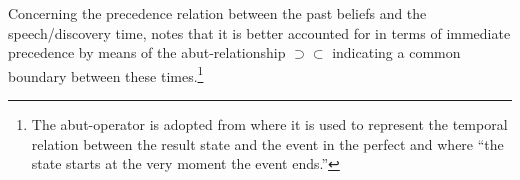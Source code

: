\documentclass[output=paper]{langscibook}
\begin{document}
Concerning the precedence relation between the past beliefs and the speech/\hspace{0pt}discovery time, \citet[58]{Bustamante2013} notes that it is better accounted for in terms of immediate precedence by means of the abut-relationship $\supset \subset$ indicating a common boundary between these times.\footnote{The abut-operator is adopted from \citet[573]{Kamp.Reyle1993} where it is used to represent the temporal relation between the result state and the event in the perfect and where ``the state starts at the very moment the event ends.''}
\end{document}
